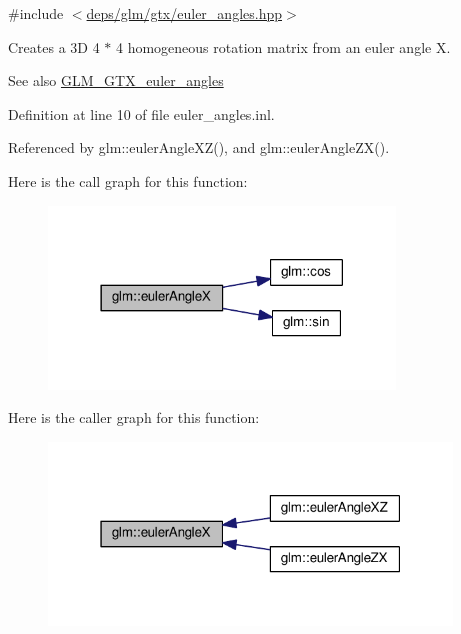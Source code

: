 {\ttfamily \#include $<$\hyperlink{euler__angles_8hpp}{deps/glm/gtx/euler\+\_\+angles.\+hpp}$>$}

Creates a 3D 4 $\ast$ 4 homogeneous rotation matrix from an euler angle X. \begin{DoxySeeAlso}{See also}
\hyperlink{group__gtx__euler__angles}{G\+L\+M\+\_\+\+G\+T\+X\+\_\+euler\+\_\+angles} 
\end{DoxySeeAlso}


Definition at line 10 of file euler\+\_\+angles.\+inl.



Referenced by glm\+::euler\+Angle\+X\+Z(), and glm\+::euler\+Angle\+Z\+X().

Here is the call graph for this function\+:
\nopagebreak
\begin{figure}[H]
\begin{center}
\leavevmode
\includegraphics[width=261pt]{d2/d7e/group__gtx__euler__angles_gafba6282e4ed3ff8b5c75331abfba3489_cgraph}
\end{center}
\end{figure}
Here is the caller graph for this function\+:
\nopagebreak
\begin{figure}[H]
\begin{center}
\leavevmode
\includegraphics[width=304pt]{d2/d7e/group__gtx__euler__angles_gafba6282e4ed3ff8b5c75331abfba3489_icgraph}
\end{center}
\end{figure}
\mbox{\label{group__gtx__euler__angles_ga64036577ee17a2d24be0dbc05881d4e2}} 
